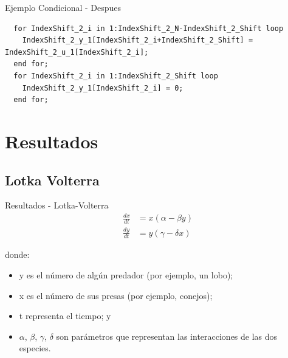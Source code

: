 \documentclass[10pt,presentation]{beamer}
\begin{document}
\begin{frame}[fragile]{Ejemplo Condicional - Despues}
\begin{verbatim}
  for IndexShift_2_i in 1:IndexShift_2_N-IndexShift_2_Shift loop
    IndexShift_2_y_1[IndexShift_2_i+IndexShift_2_Shift] = IndexShift_2_u_1[IndexShift_2_i];
  end for;
  for IndexShift_2_i in 1:IndexShift_2_Shift loop
    IndexShift_2_y_1[IndexShift_2_i] = 0;
  end for;
\end{verbatim}
\end{frame}

\section{Resultados}
	\subsection{Lotka Volterra}
\begin{frame}{Resultados - Lotka-Volterra}
\begin{align*}
\frac{dx}{dt} & = x(\alpha - \beta y)\\
\frac{dy}{dt} & =y(\gamma - \delta  x)
\end{align*}

donde:
\begin{itemize}
    \item y es el número de algún predador (por ejemplo, un lobo);
    \item x es el número de sus presas (por ejemplo, conejos);
    \item t representa el tiempo; y
    \item $\alpha$, $\beta$, $\gamma$, $\delta$ son parámetros que representan las interacciones de las dos especies.
\end{itemize}
\end{frame}
\end{document}
